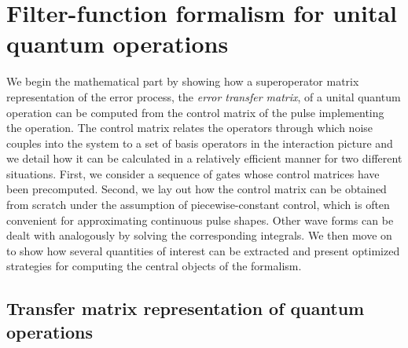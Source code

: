 \chapter{Filter-function formalism for unital quantum operations}\label{ch:ff:theory}
We begin the mathematical part by showing how a superoperator matrix representation of the error process, the \emph{error transfer matrix}, of a unital quantum operation can be computed from the control matrix of the pulse implementing the operation.
The control matrix relates the operators through which noise couples into the system to a set of basis operators in the interaction picture and we detail how it can be calculated in a relatively efficient manner for two different situations.
First, we consider a sequence of gates whose control matrices have been precomputed.
Second, we lay out how the control matrix can be obtained from scratch under the assumption of piecewise-constant control, which is often convenient for approximating continuous pulse shapes.
Other wave forms can be dealt with analogously by solving the corresponding integrals.
We then move on to show how several quantities of interest can be extracted and present optimized strategies for computing the central objects of the formalism.

\section{Transfer matrix representation of quantum operations}\label{sec:ff:theory:transfer_matrix}
